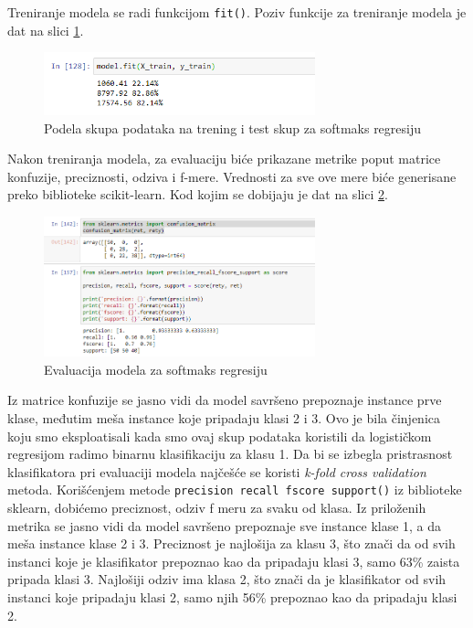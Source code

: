 \documentclass[a4paper,12pt]{report}
\begin{document}
Treniranje modela se radi funkcijom \texttt{fit()}. Poziv funkcije za treniranje modela je dat na slici \ref{fig:softtrain}. \\

\begin{figure}[h]
    \centering
    \includegraphics[width=0.7\textwidth]{softmax_train.png}
    \caption{Podela skupa podataka na trening i test skup za softmaks regresiju}\label{fig:softtrain}
\end{figure}

Nakon treniranja modela, za evaluaciju biće prikazane metrike poput matrice konfuzije, preciznosti, odziva i f-mere. Vrednosti za sve ove mere biće generisane preko biblioteke scikit-learn. Kod kojim se dobijaju je dat na slici \ref{fig:softmaxeval}. \\

\begin{figure}[h]
    \centering
    \includegraphics[width=0.7\textwidth]{softmax_evaluation.png}
    \caption{Evaluacija modela za softmaks regresiju}\label{fig:softmaxeval}
\end{figure}

Iz matrice konfuzije se jasno vidi da model savršeno prepoznaje instance prve klase, međutim meša instance koje pripadaju klasi 2 i 3. Ovo je bila činjenica koju smo eksploatisali kada smo ovaj skup podataka koristili da logističkom regresijom radimo binarnu klasifikaciju za klasu 1. Da bi se izbegla pristrasnost klasifikatora pri evaluaciji modela najčešće se koristi \textit{k-fold cross validation} metoda. Korišćenjem metode \texttt{precision recall fscore support()} iz biblioteke sklearn, dobićemo preciznost, odziv f meru za svaku od klasa. Iz priloženih metrika se jasno vidi da model savršeno prepoznaje sve instance klase 1, a da meša instance klase 2 i 3. Preciznost je najlošija za klasu 3, što znači da od svih instanci koje je klasifikator prepoznao kao da pripadaju klasi 3, samo 63\% zaista pripada klasi 3. Najlošiji odziv ima klasa 2, što znači da je klasifikator od svih instanci koje pripadaju klasi 2, samo njih 56\% prepoznao kao da pripadaju klasi 2. \\
\end{document}
